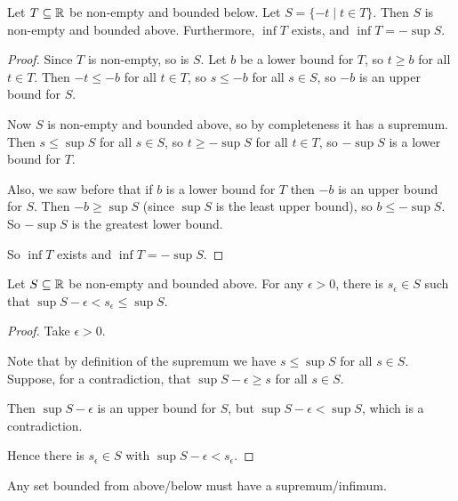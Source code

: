 \begin{proposition}
Let $T \subseteq \mathbb R$ be non-empty and bounded below. Let $S = \{-t \mid t \in T\}$. Then $S$ is non-empty and bounded above. Furthermore, $\inf T$ exists, and $\inf T = -\sup S$.
\end{proposition}
\begin{proof}
Since $T$ is non-empty, so is $S$. Let $b$ be a lower bound for $T$, so $t \ge b$ for all $t \in T$. Then $-t \le -b$ for all $t \in T$, so $s \le -b$ for all $s \in S$, so $-b$ is an upper
bound for $S$.

Now $S$ is non-empty and bounded above, so by completeness it has a
supremum. Then $s \le \sup S$ for all $s \in S$, so $t \ge -\sup S$ for all $t \in T$, so $-\sup S$ is a lower bound for $T$.

Also, we saw before that if $b$ is a lower bound for $T$ then $-b$ is an upper bound for $S$. Then $-b \ge \sup S$ (since $\sup S$ is the least upper bound), so $b \le -\sup S$. So $-\sup S$ is the greatest lower bound.

So $\inf T$ exists and $\inf T = -\sup S$.
\end{proof}

\begin{proposition}
Let $S \subseteq \mathbb R$ be non-empty and bounded above. For any $\epsilon > 0$, there is $s_\epsilon \in S$ such that $\sup S-\epsilon < s_\epsilon \le \sup S$.
\end{proposition}
\begin{proof}
Take $\epsilon > 0$.

Note that by definition of the supremum we have $s \le \sup S$ for all $s \in S$. Suppose, for a contradiction, that $\sup S-\epsilon \ge s$ for all $s \in S$.

Then $\sup S-\epsilon$ is an upper bound for $S$, but $\sup S-\epsilon < \sup S$, which is a contradiction.

Hence there is $s_\epsilon \in S$ with $\sup S-\epsilon<s_\epsilon$.
\end{proof}

\begin{theorem}
Any set bounded from above/below must have a supremum/infimum.
\end{theorem}

